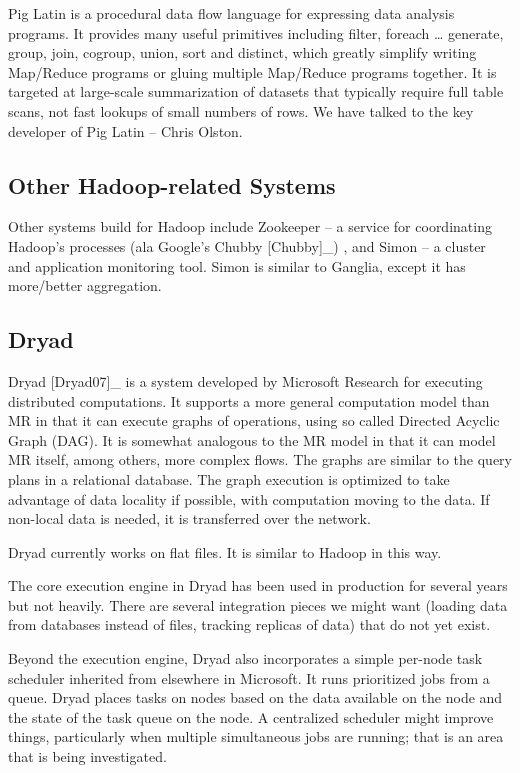 \documentclass[DM,lsstdraft,toc]{lsstdoc}
\begin{document}
Pig Latin is a procedural data flow language for expressing data
analysis programs. It provides many useful primitives including filter,
foreach \ldots{} generate, group, join, cogroup, union, sort and
distinct, which greatly simplify writing Map/Reduce programs or gluing
multiple Map/Reduce programs together. It is targeted at large-scale
summarization of datasets that typically require full table scans, not
fast lookups of small numbers of rows. We have talked to the key
developer of Pig Latin -- Chris Olston.

\subsection{Other Hadoop-related
Systems}\label{other-hadoop-related-systems}

Other systems build for Hadoop include
Zookeeper -- a
service for coordinating Hadoop's processes (ala Google's Chubby
{[}Chubby{]}\_) , and Simon -- a cluster and application monitoring
tool. Simon is similar to Ganglia, except it has more/better
aggregation.

\subsection{Dryad}\label{dryad}

Dryad
{[}Dryad07{]}\_ is a system developed by Microsoft Research for
executing distributed computations. It supports a more general
computation model than MR in that it can execute graphs of operations,
using so called Directed Acyclic Graph (DAG). It is somewhat analogous
to the MR model in that it can model MR itself, among others, more
complex flows. The graphs are similar to the query plans in a relational
database. The graph execution is optimized to take advantage of data
locality if possible, with computation moving to the data. If non-local
data is needed, it is transferred over the network.

Dryad
currently works on flat files. It is similar to Hadoop in this way.

The core execution engine in
Dryad has
been used in production for several years but not heavily. There are
several integration pieces we might want (loading data from databases
instead of files, tracking replicas of data) that do not yet exist.

Beyond the execution engine,
Dryad also
incorporates a simple per-node task scheduler inherited from elsewhere
in Microsoft. It runs prioritized jobs from a queue.
Dryad places
tasks on nodes based on the data available on the node and the state of
the task queue on the node. A centralized scheduler might improve
things, particularly when multiple simultaneous jobs are running; that
is an area that is being investigated.
\end{document}
